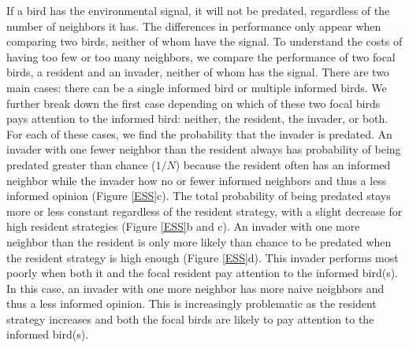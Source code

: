 \documentclass{article}
\begin{document}
If a bird has the environmental signal, it will not be predated, regardless of the number of neighbors it has. The differences in performance only appear when comparing two birds, neither of whom have the signal. To understand the costs of having too few or too many neighbors, we compare the performance of two focal birds, a resident and an invader, neither of whom has the signal.  There are two main cases: there can be a single informed bird or multiple informed birds. We further break down the first case depending on which of these two focal birds pays attention to the informed bird: neither, the resident, the invader, or both. For each of these cases, we find the probability that the invader is predated. An invader with one fewer neighbor than the resident always has probability of being predated greater than chance ($1/N$) because the resident often has an informed neighbor while the invader how no or fewer informed neighbors and thus a less informed opinion (Figure \ref{ESS}c). The total probability of being predated stays more or less constant regardless of the resident strategy, with a slight decrease for high resident strategies (Figure \ref{ESS}b and c). An invader with one more neighbor than the resident is only more likely than chance to be predated when the resident strategy is high enough  (Figure \ref{ESS}d). This invader performs most poorly when both it and the focal resident pay attention to the informed bird(s). In this case, an invader with one more neighbor has more naive neighbors and thus a less informed opinion. This is increasingly problematic as the resident strategy increases and both the focal birds are likely to pay attention to the informed bird(s).
\end{document}
